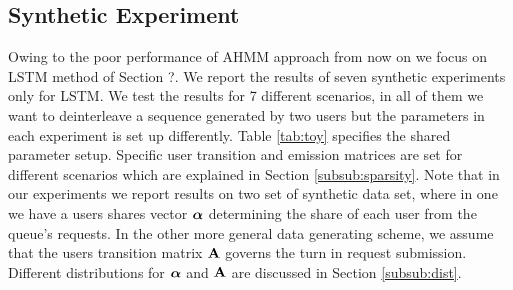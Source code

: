 	\subsection{Synthetic Experiment}
	\label{subsec:synthetic}
	Owing to the poor performance of AHMM approach from now on we focus on LSTM method of Section ?.
	We report the results of seven synthetic experiments only for LSTM. %
	We test the results for 7 different scenarios, in all of them we want to deinterleave a sequence generated by two users but the parameters in each experiment is set up differently.
	Table \ref{tab:toy} specifies the shared parameter setup. %
	Specific user transition and emission matrices are set for different scenarios which are explained in Section \ref{subsub:sparsity}.
	Note that in our experiments we report results on two set of synthetic data set, where in one we have a users shares vector $\boldsymbol{\alpha}$ determining the share of each user from the queue's requests.
	In the other more general data generating scheme, we assume that the users transition matrix $\mathbf{A}$ governs the turn in request submission.
	Different distributions for $\boldsymbol{\alpha}$ and $\mathbf{A}$ are discussed in Section \ref{subsub:dist}.
	
